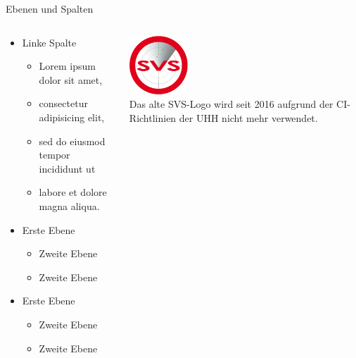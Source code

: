\documentclass[t,aspectratio=169]{beamer}
\begin{document}
\begin{frame}{Ebenen und Spalten}
	\begin{columns}[T]
		\begin{column}{.57\textwidth}
			\begin{itemize}
				\item Linke Spalte
				\begin{itemize}
					\item Lorem ipsum dolor sit amet, 
					\item consectetur adipisicing elit, 
					\item sed do eiusmod tempor incididunt ut 
					\item labore et dolore magna aliqua. 
				\end{itemize}
				\item Erste Ebene
				\begin{itemize}
					\item Zweite Ebene
					\item Zweite Ebene
				\end{itemize}
				\item Erste Ebene
				\begin{itemize}
					\item Zweite Ebene
					\item Zweite Ebene
				\end{itemize}
			\end{itemize}
		\end{column}
		\begin{column}{.37\textwidth}
			\begin{center}
				\vspace{0.5cm}
				\includegraphics[width=2.2cm]{../pic/svs_logo_uhhred.png} \\
				\small
				Das alte SVS-Logo wird seit 2016 aufgrund der CI-Richtlinien der UHH nicht mehr verwendet.
			\end{center}
		\end{column}
	\end{columns}
\end{frame}
\end{document}
